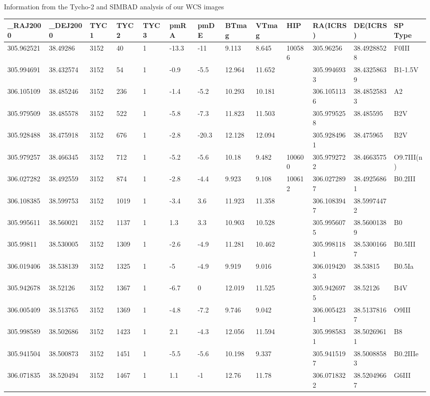\caption{Information from the Tycho-2 and SIMBAD analysis of our WCS images}
\begin{tabular}{lllllllllllll}
	\hline\hline
	\_RAJ2000  & \_DEJ2000 & TYC1 & TYC2 & TYC3 & pmRA  & pmDE  & BTmag  & VTmag  & HIP    & RA(ICRS)    & DE(ICRS)    & SP Type    \\ \hline
	305.962521 & 38.49286  & 3152 & 40   & 1    & -13.3 & -11   & 9.113  & 8.645  & 100586 & 305.96256   & 38.49288528 & F0III      \\
	305.994691 & 38.432574 & 3152 & 54   & 1    & -0.9  & -5.5  & 12.964 & 11.652 &        & 305.9946933 & 38.43258639 & B1-1.5V    \\
	306.105109 & 38.485246 & 3152 & 236  & 1    & -1.4  & -5.2  & 10.293 & 10.181 &        & 306.1051136 & 38.48525833 & A2         \\
	305.979509 & 38.485578 & 3152 & 522  & 1    & -5.8  & -7.3  & 11.823 & 11.503 &        & 305.9795258 & 38.485595   & B2V        \\
	305.928488 & 38.475918 & 3152 & 676  & 1    & -2.8  & -20.3 & 12.128 & 12.094 &        & 305.9284961 & 38.475965   & B2V        \\
	305.979257 & 38.466345 & 3152 & 712  & 1    & -5.2  & -5.6  & 10.18  & 9.482  & 100600 & 305.9792722 & 38.4663575  & O9.7III(n) \\
	306.027282 & 38.492559 & 3152 & 874  & 1    & -2.8  & -4.4  & 9.923  & 9.108  & 100612 & 306.0272897 & 38.49256861 & B0.2III    \\
	306.108385 & 38.599753 & 3152 & 1019 & 1    & -3.4  & 3.6   & 11.923 & 11.358 &        & 306.1083947 & 38.59974472 &            \\
	305.995611 & 38.560021 & 3152 & 1137 & 1    & 1.3   & 3.3   & 10.903 & 10.528 &        & 305.9956075 & 38.56001389 & B0         \\
	305.99811  & 38.530005 & 3152 & 1309 & 1    & -2.6  & -4.9  & 11.281 & 10.462 &        & 305.9981181 & 38.53001667 & B0.5III    \\
	306.019406 & 38.538139 & 3152 & 1325 & 1    & -5    & -4.9  & 9.919  & 9.016  &        & 306.0194203 & 38.53815    & B0.5Ia     \\
	305.942678 & 38.52126  & 3152 & 1367 & 1    & -6.7  & 0     & 12.019 & 11.525 &        & 305.9426975 & 38.52126    & B4V        \\
	306.005409 & 38.513765 & 3152 & 1369 & 1    & -4.8  & -7.2  & 9.746  & 9.042  &        & 306.0054231 & 38.51378167 & O9III      \\
	305.998589 & 38.502686 & 3152 & 1423 & 1    & 2.1   & -4.3  & 12.056 & 11.594 &        & 305.9985831 & 38.50269611 & B8         \\
	305.941504 & 38.500873 & 3152 & 1451 & 1    & -5.5  & -5.6  & 10.198 & 9.337  &        & 305.9415197 & 38.50088583 & B0.2IIIe   \\
	306.071835 & 38.520494 & 3152 & 1467 & 1    & 1.1   & -1    & 12.76  & 11.78  &        & 306.0718322 & 38.52049667 & G6III      \\ \hline
\end{tabular}